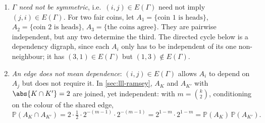 \begin{remark}\label{rmk:dependency-digraph}\hfill
    \begin{enumerate}[(1)]
        \item \emph{\(\Gamma\) need not be symmetric}, i.e.\ \((i,j) \in E(\Gamma)\) need not imply \((j,i) \in E(\Gamma)\). For two fair coins, let \(A_{1} = \{\text{coin 1 is heads}\}\), \(A_{2} = \{\text{coin 2 is heads}\}\), \(A_{3} = \{\text{the coins agree}\}\). They are pairwise independent, but any two determine the third. The directed cycle below is a dependency digraph, since each \(A_{i}\) only has to be independent of its one non-neighbour; it has \((3,1) \in E(\Gamma)\) but \((1,3) \notin E(\Gamma)\).
        \begin{center}
        \end{center}
        \item \emph{An edge does not mean dependence}: \((i,j) \in E(\Gamma)\) allows \(A_{i}\) to depend on \(A_{j}\) but does not require it. In \autoref{sec:lll-ramsey}, \(A_{K}\) and \(A_{K'}\) with \(\abs{K \cap K'} = 2\) are joined, yet independent: with \(m = \binom{k}{2}\), conditioning on the colour of the shared edge,
        \[
            \mathbb{P}(A_{K} \cap A_{K'}) = 2 \cdot \tfrac{1}{2} \cdot 2^{-(m-1)} \cdot 2^{-(m-1)} = 2^{1-m} \cdot 2^{1-m} = \mathbb{P}(A_{K}) \, \mathbb{P}(A_{K'}) .
        \]
        \begin{center}

\end{center}
\end{enumerate}
\end{remark}
